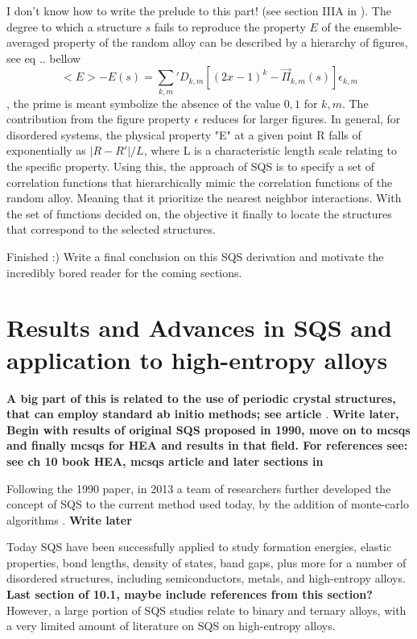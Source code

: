 I don't know how to write the prelude to this part! (see section IIIA in \cite{sqsfull}). The degree to which a structure $s$ fails to reproduce the property $E$ of the ensemble-averaged property of the random alloy can be described by a hierarchy of figures, see eq .. bellow
\begin{equation}
    <E> - E(s) = \sum_{k,m}' D_{k,m}[(2x-1)^k-\vec{\Pi}_{k,m}(s)]\epsilon_{k,m}
\end{equation}
, the prime is meant symbolize the absence of the value $0,1$ for $k,m$. The contribution from the figure property $\epsilon$ reduces for larger figures. In general, for disordered systems, the physical property "E" at a given point R falls of exponentially as $|R-R'|/L$, where L is a characteristic length scale relating to the specific property. Using this, the approach of SQS is to specify a set of correlation functions that hierarchically mimic the correlation functions of the random alloy. Meaning that it prioritize the nearest neighbor interactions. With the set of functions decided on, the objective it finally to locate the structures that correspond to the selected structures. 

Finished :) Write a final conclusion on this SQS derivation and motivate the incredibly bored reader for the coming sections. 

\section{Results and Advances in SQS and application to high-entropy alloys}
\textbf{A big part of this is related to the use of periodic crystal structures, that can employ standard ab initio methods; see article \cite{sqsfull}}.
\textbf{Write later, Begin with results of original SQS proposed in 1990, move on to mcsqs and finally mcsqs for HEA and results in that field. For references see: 
see ch 10 book HEA, mcsqs article and later sections in \cite{sqsfull}}

Following the 1990 paper, in 2013 a team of researchers further developed the concept of SQS to the current method used today, by the addition of monte-carlo algorithms \cite{mcsqs2013}. \textbf{Write later}

Today SQS have been successfully applied to study formation energies, elastic properties, bond lengths, density of states, band gaps, plus more for a number of disordered structures, including semiconductors, metals, and high-entropy alloys. \textbf{Last section of 10.1, maybe include references from this section?} However, a large portion of SQS studies relate to binary and ternary alloys, with a very limited amount of literature on SQS on high-entropy alloys. 